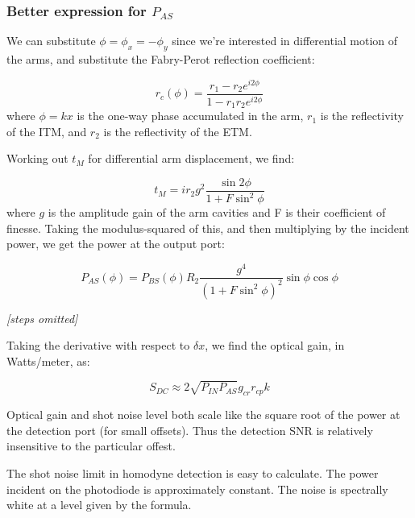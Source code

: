 \subsubsection{Better expression for $P_{AS}$}

We can substitute $\phi=\phi_{x}=-\phi_{y}$ since we're interested
in differential motion of the arms, and substitute the Fabry-Perot
reflection coefficient:

\begin{equation}
r_{c}(\phi)=\frac{r_{1}-r_{2}e^{i2\phi}}{1-r_{1}r_{2}e^{i2\phi}}\end{equation}
where $\phi=kx$ is the one-way phase accumulated in the arm, $r_{1}$
is the reflectivity of the ITM, and $r_{2}$ is the reflectivity of
the ETM.

Working out $t_{M}$ for differential arm displacement, we find:

\begin{equation}
t_{M}=ir_{2}g^{2}\frac{\sin2\phi}{1+F\sin^{2}\phi}\end{equation}
where $g$ is the amplitude gain of the arm cavities and F is their
coefficient of finesse. Taking the modulus-squared of this, and then
multiplying by the incident power, we get the power at the output
port:

\begin{equation}
P_{AS}(\phi)=P_{BS}(\phi)R_{2}\frac{g^{4}}{\left(1+F\sin^{2}\phi\right)^{2}}\sin\phi\cos\phi\end{equation}


\emph{{[}steps omitted{]}}

Taking the derivative with respect to $\delta x$, we find the optical
gain, in Watts/meter, as:

\begin{equation}
S_{DC}\approx2\sqrt{P_{IN}P_{AS}}g_{cr}r_{cp}k\label{eq:dc-readout-optical-gain}
\end{equation}



Optical gain and shot noise level both scale like the square root of
the power at the detection port (for small offsets).  Thus the
detection SNR is relatively insensitive to the particular offest.



The shot noise limit in homodyne detection is easy to calculate.  The
power incident on the photodiode is approximately constant.  The noise
is spectrally white at a level given by the formula.

